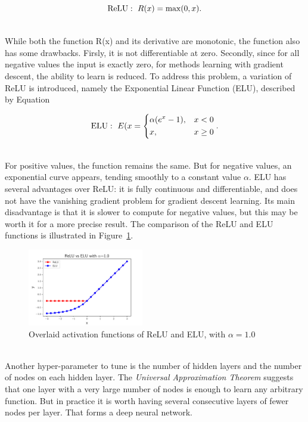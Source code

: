 \begin{equation}
   \ReLU:~R(x)= \max(0, x).
\end{equation}

\ \\While both the function R(x) and its derivative are monotonic, the function also has some drawbacks. Firsly, it is not differentiable at zero. Secondly, since for all negative values the input is exactly zero, for methods learning with gradient descent, the ability to learn is reduced. To address this problem, a variation of ReLU is introduced, namely the Exponential Linear Function (ELU), described by Equation

\begin{equation}
     \ELU:~E(x= 
\begin{dcases}
    \alpha(e^x -1), & x < 0\\
    x,              & x \geq 0
\end{dcases}.
\end{equation}

\ \\For positive values, the function remains the same. But for negative values, an exponential curve appears, tending smoothly to a constant value $\alpha$. ELU has several advantages over ReLU: it is fully continuous and differentiable, and does not have the vanishing gradient problem for gradient descent learning. Its main disadvantage is that it is slower to compute for negative values, but this may be worth it for a more precise result. The comparison of the ReLU and ELU functions is illustrated in Figure~\ref{fig:ActivationFunctionsHiddenLayers}.

\begin{figure}[htb]
\centering
\includegraphics[width=0.45\textwidth]{plots/ActivationFunctionsHiddenLayers.pdf}
\caption{Overlaid activation functions of ReLU and ELU, with $\alpha=1.0$}
\label{fig:ActivationFunctionsHiddenLayers}
\end{figure}

\ \\Another hyper-parameter to tune is the number of hidden layers and the number of nodes on each hidden layer. The \emph{Universal Approximation Theorem} suggests that one layer with a very large number of nodes is enough to learn any arbitrary function. But in practice it is worth having several consecutive layers of fewer nodes per layer. That forms a deep neural network. 

